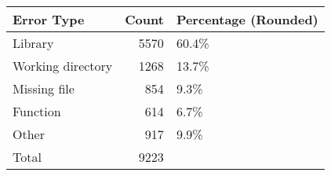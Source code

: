 \begin{tabular}{lrl}
\toprule
       Error Type &  Count & Percentage (Rounded) \\
\midrule
          Library &   5570 &                60.4\% \\ \hline
Working directory &   1268 &                13.7\% \\ \hline
     Missing file &    854 &                 9.3\% \\ \hline
         Function &    614 &                 6.7\% \\ \hline
            Other &    917 &                 9.9\% \\ \hline
            Total &   9223 &                      \\
\bottomrule
\end{tabular}
